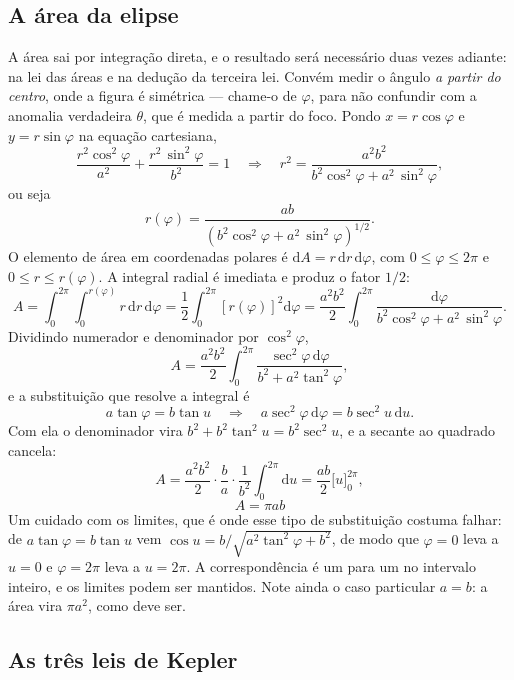 \documentclass[11pt,a4paper]{article}
\begin{document}
\subsection*{A área da elipse}

A área sai por integração direta, e o resultado será necessário duas vezes adiante: na lei das áreas e na dedução da terceira lei. Convém medir o ângulo \textit{a partir do centro}, onde a figura é simétrica --- chame-o de $\varphi$, para não confundir com a anomalia verdadeira $\theta$, que é medida a partir do foco. Pondo $x=r\cos\varphi$ e $y=r\sin\varphi$ na equação cartesiana,
\[
\frac{r^{2}\cos^{2}\varphi}{a^{2}}+\frac{r^{2}\,\sin^{2}\varphi}{b^{2}}=1
\quad\Longrightarrow\quad
r^{2}=\frac{a^{2}b^{2}}{b^{2}\cos^{2}\varphi+a^{2}\,\sin^{2}\varphi},
\]
ou seja
\[
r(\varphi)=\frac{ab}{\left(b^{2}\cos^{2}\varphi+a^{2}\,\sin^{2}\varphi\right)^{1/2}}.
\]
O elemento de área em coordenadas polares é $\mathrm{d}A=r\,\mathrm{d}r\,\mathrm{d}\varphi$, com $0\le\varphi\le2\pi$ e $0\le r\le r(\varphi)$. A integral radial é imediata e produz o fator $1/2$:
\[
A=\int_{0}^{2\pi}\!\!\int_{0}^{r(\varphi)} r\,\mathrm{d}r\,\mathrm{d}\varphi
 =\frac{1}{2}\int_{0}^{2\pi}\left[r(\varphi)\right]^{2}\mathrm{d}\varphi
 =\frac{a^{2}b^{2}}{2}\int_{0}^{2\pi}\frac{\mathrm{d}\varphi}{b^{2}\cos^{2}\varphi+a^{2}\,\sin^{2}\varphi}.
\]
Dividindo numerador e denominador por $\cos^{2}\varphi$,
\[
A=\frac{a^{2}b^{2}}{2}\int_{0}^{2\pi}\frac{\sec^{2}\varphi\,\mathrm{d}\varphi}{b^{2}+a^{2}\tan^{2}\varphi},
\]
e a substituição que resolve a integral é
\[
a\tan\varphi=b\tan u
\quad\Longrightarrow\quad
a\sec^{2}\varphi\,\mathrm{d}\varphi=b\sec^{2}u\,\mathrm{d}u .
\]
Com ela o denominador vira $b^{2}+b^{2}\tan^{2}u=b^{2}\sec^{2}u$, e a secante ao quadrado cancela:
\[
A=\frac{a^{2}b^{2}}{2}\cdot\frac{b}{a}\cdot\frac{1}{b^{2}}\int_{0}^{2\pi}\mathrm{d}u
 =\frac{ab}{2}\Big[u\Big]_{0}^{2\pi},
\]
\[
\boxed{\ A=\pi ab\ }
\]
Um cuidado com os limites, que é onde esse tipo de substituição costuma falhar: de $a\tan\varphi=b\tan u$ vem $\cos u=b/\sqrt{a^{2}\tan^{2}\varphi+b^{2}}$, de modo que $\varphi=0$ leva a $u=0$ e $\varphi=2\pi$ leva a $u=2\pi$. A correspondência é um para um no intervalo inteiro, e os limites podem ser mantidos. Note ainda o caso particular $a=b$: a área vira $\pi a^{2}$, como deve ser.

\subsection*{As três leis de Kepler}
\end{document}
